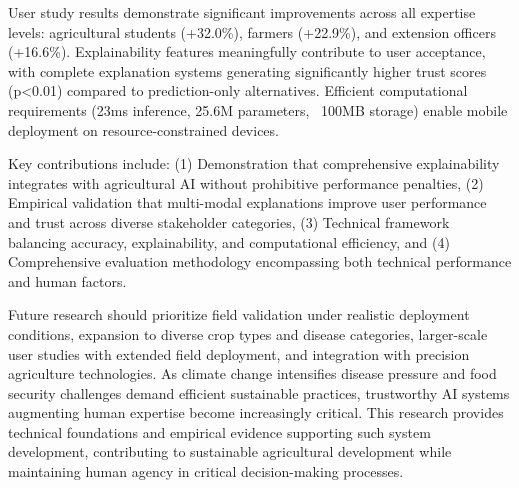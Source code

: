\documentclass[agriculture,article,submit,pdftex,moreauthors]{Definitions/mdpi}
\begin{document}
User study results demonstrate significant improvements across all expertise levels: agricultural students (+32.0\%), farmers (+22.9\%), and extension officers (+16.6\%). Explainability features meaningfully contribute to user acceptance, with complete explanation systems generating significantly higher trust scores (p<0.01) compared to prediction-only alternatives. Efficient computational requirements (23ms inference, 25.6M parameters, ~100MB storage) enable mobile deployment on resource-constrained devices.

Key contributions include: (1) Demonstration that comprehensive explainability integrates with agricultural AI without prohibitive performance penalties, (2) Empirical validation that multi-modal explanations improve user performance and trust across diverse stakeholder categories, (3) Technical framework balancing accuracy, explainability, and computational efficiency, and (4) Comprehensive evaluation methodology encompassing both technical performance and human factors.

Future research should prioritize field validation under realistic deployment conditions, expansion to diverse crop types and disease categories, larger-scale user studies with extended field deployment, and integration with precision agriculture technologies. As climate change intensifies disease pressure and food security challenges demand efficient sustainable practices, trustworthy AI systems augmenting human expertise become increasingly critical. This research provides technical foundations and empirical evidence supporting such system development, contributing to sustainable agricultural development while maintaining human agency in critical decision-making processes.

\vspace{6pt}

\end{document}
